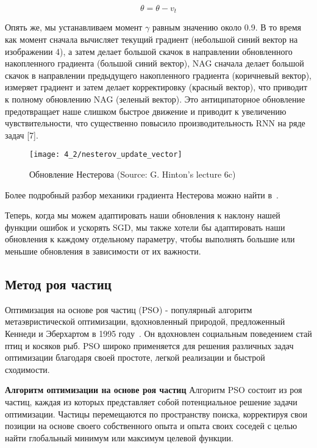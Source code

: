 \begin{equation*}
\theta = \theta - v_t
\end{equation*}

Опять же, мы устанавливаем момент $\gamma$ равным значению около 0.9.
В то время как момент сначала вычисляет текущий
градиент (небольшой синий вектор на изображении 4),
а затем делает большой скачок в направлении обновленного
накопленного градиента (большой синий вектор), NAG сначала делает
большой скачок в направлении предыдущего накопленного градиента
(коричневый вектор), измеряет градиент и затем делает корректировку
(красный вектор), что приводит к полному обновлению NAG (зеленый вектор).
Это антиципаторное обновление предотвращает
наше слишком быстрое движение и приводит к увеличению чувствительности,
что существенно повысило производительность RNN на ряде задач [7].

\begin{figure}[h!]
    \centering
    {\texttt{[image: 4\_2/nesterov\_update\_vector]} }
    \caption{Обновление Нестерова (Source: G. Hinton's lecture 6c)}
\end{figure}

Более подробный разбор механики градиента Нестерова
можно найти в~\cite{Sutskever2013}.

Теперь, когда мы можем адаптировать наши обновления к наклону
нашей функции ошибок и ускорять SGD, мы также хотели бы адаптировать
наши обновления к каждому отдельному параметру, чтобы выполнять
большие или меньшие обновления в зависимости от их важности.


\subsection{Метод роя частиц}\label{subsec:ch4/sec2/stokhastic}
Оптимизация на основе роя частиц (PSO) - популярный алгоритм метаэвристической
оптимизации, вдохновленный природой, предложенный Кеннеди и Эберхартом
в 1995 году~\cite{kennedy1995}.
Он вдохновлен социальным поведением стай птиц и косяков рыб.
PSO широко применяется для решения различных задач оптимизации благодаря
своей простоте, легкой реализации и быстрой сходимости.

\textbf{Алгоритм оптимизации на основе роя частиц}
Алгоритм PSO состоит из роя частиц, каждая из которых представляет собой
потенциальное решение задачи оптимизации.
Частицы перемещаются по пространству поиска, корректируя свои позиции
на основе своего собственного опыта и опыта своих соседей с целью найти
глобальный минимум или максимум целевой функции.

